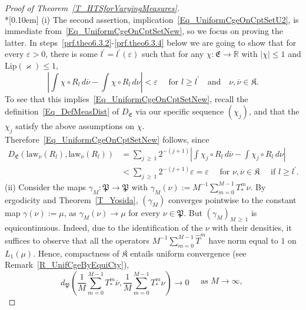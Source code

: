 \documentclass[10pt]{amsart}
\theoremstyle{definition}\newtheorem{defi}[theo]{Definition}\newtheorem{rema}[theo]{Remark}\newtheorem{exam}[theo]{Example}\newtheorem{exem}[theo]{Example}\newtheorem{nota}[theo]{Notation}
\newcommand{\law}{\mathrm{law}}
\newcommand{\Lip}{\mathrm{Lip}}
\newcommand{\frkK}{\mathfrak{K}}
\newcommand{\frkP}{\mathfrak{P}}
\newcommand{\frkE}{\mathfrak{E}}
\newcommand{\bbR}{\mathbb{R}}
\begin{document}
\begin{proof}[{Proof of Theorem~\ref{T_HTSforVaryingMeasures}}]\ \\*[0.10em]
\noindent(i) \label{prf.theo6.3.1} The second assertion, implication~\eqref{Eq_UniformCgeOnCptSetU2}, is immediate from~\eqref{Eq_UniformCgeOnCptSetNew}, so we focus on proving the latter. In steps~\eqref{prf.theo6.3.2}-\eqref{prf.theo6.3.4} below we are going to show that for every $\varepsilon>0$, there is some $l^{\prime}=l^{\prime}(\varepsilon)$ such that for any $\chi:\frkE\rightarrow\bbR$ with $\left\vert \chi\right\vert
\leq1$ and $\Lip(\varkappa)\leq1$,
\begin{equation}\label{Eq_Abschaetzig}
\left\vert \int\chi\circ R_{l}\,d\overline{\nu}-\int\chi\circ R_{l}
\,d\nu\right\vert <\varepsilon \quad\text{ for }l\geq l^{\prime}\quad\text{and}\quad\nu,\overline{\nu}\in\frkK.
\end{equation}
To see that this implies~\eqref{Eq_UniformCgeOnCptSetNew}, recall the definition~\eqref{Eq_DefMeasDist} of $D_{\frkE}$ via our specific sequence $(\chi_{j})$, and that the $\chi_{j}$ satisfy the above assumptions on $\chi$. Therefore~\eqref{Eq_UniformCgeOnCptSetNew} follows, since
\begin{align*}
D_{\frkE}\left(\law_{\nu}(R_{l}),\law_{\overline{\nu}} (R_{l})\right) & =\sum_{j\,\geq\,1}2^{-(j+1)}\left\vert \int\chi_{j}\circ R_{l}\,d\overline{\nu}-\int\chi_{j}\circ R_{l}\,d\nu\right\vert \\
& <\sum\limits_{j\,\geq\,1}2^{-(j+1)}\varepsilon=\varepsilon\quad\text{ for }\nu,\overline{\nu}\in\frkK\quad \text{ if }l\geq l^{\prime}.
\end{align*}
(ii)\label{prf.theo6.3.2} Consider the maps $\gamma_{M}:\frkP
\rightarrow\frkP$ with $\gamma_{M}(\nu):=M^{-1} {\sum_{m=0}^{M-1}} T_{\ast}^{m}\nu$. By ergodicity and Theorem~\ref{T_Yosida}, $(\gamma_{M})$ converges pointwise to the constant map $\gamma(\nu):=\mu$, as $\gamma_{M} (\nu)\rightarrow\mu$ for every $\nu\in\frkP$. But $(\gamma_{M})_{M\,\geq\,1}$ is equicontinuous. Indeed, due to the identification of the $\nu$ with their densities, it suffices to observe that all the operators $M^{-1} {\sum\nolimits_{m=0}^{M-1}}
\widehat{T}^{m}$ have norm equal to $1$ on $L_{1}(\mu)$. Hence, compactness of $\frkK$ entails uniform convergence (see Remark~\ref{R_UnifCgeByEquiCty}),
\[
d_{\frkP}\left(\frac{1}{M}\sum_{m=0}^{M-1}T_{\ast}^{m}\overline{\nu },\frac{1}{M}\sum_{m=0}^{M-1}T_{\ast}^{m}\nu\right) \longrightarrow0
\quad
\begin{aligned}
\text{as }M\rightarrow\infty\text{,}\\

\end{aligned}\]
\end{proof}
\end{document}
